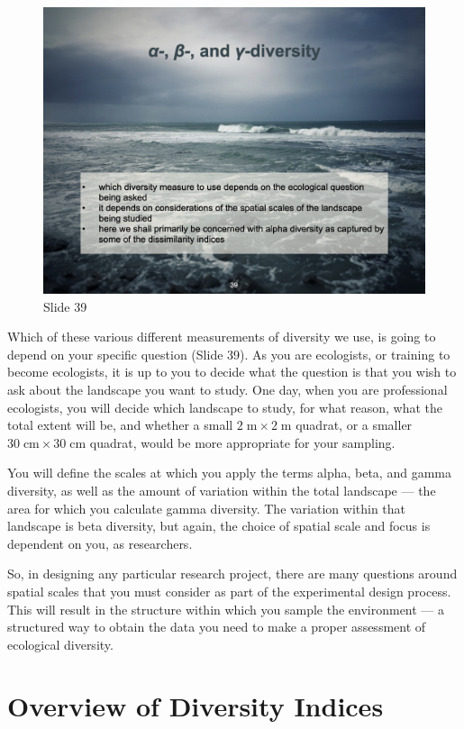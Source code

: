 \documentclass[
  10pt,
]{book}
\begin{document}
\begin{figure}[ht]
\centering
\includegraphics[width=0.8\linewidth]{../images/BDC334/BDC334-039.jpeg}
\caption*{Slide 39}
\end{figure}

Which of these various different measurements of diversity we use, is
going to depend on your specific question (Slide 39). As you are
ecologists, or training to become ecologists, it is up to you to decide
what the question is that you wish to ask about the landscape you want
to study. One day, when you are professional ecologists, you will decide
which landscape to study, for what reason, what the total extent will
be, and whether a small \(2\;\mathrm{m} \times 2\;\mathrm{m}\) quadrat,
or a smaller \(30\;\mathrm{cm} \times 30\;\mathrm{cm}\) quadrat, would
be more appropriate for your sampling.

You will define the scales at which you apply the terms alpha, beta, and
gamma diversity, as well as the amount of variation within the total
landscape --- the area for which you calculate gamma diversity. The
variation within that landscape is beta diversity, but again, the choice
of spatial scale and focus is dependent on you, as researchers.

So, in designing any particular research project, there are many
questions around spatial scales that you must consider as part of the
experimental design process. This will result in the structure within
which you sample the environment --- a structured way to obtain the data
you need to make a proper assessment of ecological diversity.

\section{Overview of Diversity
Indices}\label{overview-of-diversity-indices}
\end{document}
